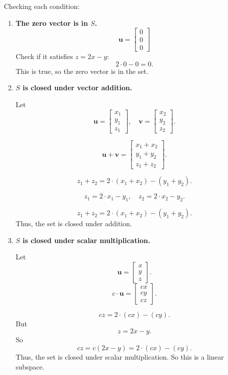 Checking each condition:
\begin{enumerate}
    \item \textbf{The zero vector is in \( S \).}
    \[
    \mathbf{u} = 
    \begin{bmatrix} 
    0 \\ 0 \\ 0
    \end{bmatrix}
    \]
    Check if it satisfies \( z = 2x - y \): 
    \[
    2 \cdot 0 - 0 = 0.
    \]
    This is true, so the zero vector is in the set.

    \item \textbf{\( S \) is closed under vector addition.}

    Let 
    \[
    \mathbf{u} = 
    \begin{bmatrix} 
    x_1 \\ y_1 \\ z_1
    \end{bmatrix}, \quad 
    \mathbf{v} = 
    \begin{bmatrix} 
    x_2 \\ y_2 \\ z_2
    \end{bmatrix}.
    \]

    \[
    \mathbf{u} + \mathbf{v} = 
    \begin{bmatrix} 
    x_1 + x_2 \\ y_1 + y_2 \\ z_1 + z_2
    \end{bmatrix}.
    \]

    \[
    z_1 + z_2 = 2 \cdot (x_1 + x_2) - (y_1 + y_2).
    \]

    \[
    z_1 = 2 \cdot x_1 - y_1, \quad z_2 = 2 \cdot x_2 - y_2.
    \]

    \[
    z_1 + z_2 = 2 \cdot (x_1 + x_2) - (y_1 + y_2).
    \]
    Thus, the set is closed under addition.

    \item \textbf{\( S \) is closed under scalar multiplication.}

    Let
    \[
    \mathbf{u} = 
    \begin{bmatrix} 
    x  \\ y \\ z
    \end{bmatrix}.
    \]
    \[
    c \cdot \mathbf{u} = 
    \begin{bmatrix} 
    cx  \\ cy \\ cz
    \end{bmatrix}.
    \]

    \[
    cz = 2 \cdot (cx) - (cy).
    \]
    But 
    \[
    z = 2x - y.
    \]
    So 
    \[
    cz = c (2x-y) = 2 \cdot (cx) - (cy).
    \]
    Thus, the set is closed under scalar multiplication. So this is a linear subspace.
\end{enumerate}
